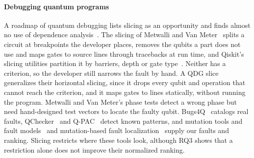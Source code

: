 \paragraph*{Debugging quantum programs}
A roadmap of quantum debugging lists slicing as an opportunity and finds almost no use of dependence
analysis~\cite{ramalho2025road}. The slicing of Metwalli and Van
Meter~\cite{metwalli2022debugging, metwalli2024testing} splits a circuit at breakpoints the developer places, removes the qubits a part does not use and maps
gates to source lines through tracebacks at run time, and Qiskit's slicing utilities partition it by
barriers, depth or gate type~\cite{qiskitaddonutils}. Neither has a criterion, so the developer still
narrows the fault by hand. A QDG slice generalizes their horizontal slicing, since it drops every qubit and
operation that cannot reach the criterion, and it maps gates to lines statically, without running the
program. Metwalli and Van Meter's phase tests detect a wrong phase
but need hand-designed test vectors to locate the faulty qubit. Bugs4Q~\cite{zhao2023bugs4q} catalogs real faults,
QChecker~\cite{zhao2023qchecker} and Q-PAC~\cite{nayak2023qpac} detect known patterns, and mutation tools and fault models~\cite{mendiluze2021muskit, fortunato2022qmutpy, garcia2022testing} and
mutation-based fault localization~\cite{ishimoto2025mbfl} supply our faults and ranking. Slicing restricts
where these tools look, although RQ3 shows that a restriction alone does not improve their normalized ranking.
